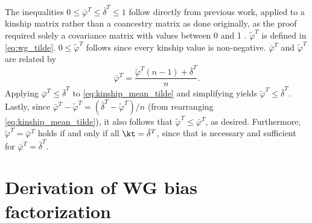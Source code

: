\documentclass[11pt]{article}
\begin{document}
\begin{appendices}
  The inequalities $0 \le \bar{\varphi}^T \le \bar{\delta}^T \le 1$ follow directly from previous work, applied to a kinship matrix rather than a coancestry matrix as done originally, as the proof required solely a covariance matrix with values between 0 and 1 \citep{ochoa_estimating_2021}.
  $\tilde{\varphi}^T$ is defined in \cref{eq:wg_tilde}.
  $0 \le \tilde{\varphi}^T$ follows since every kinship value is non-negative.
  $\bar{\varphi}^T$ and $\tilde{\varphi}^T$ are related by
  \begin{equation}
    \label{eq:kinship_mean_tilde}
    \bar{\varphi}^T
    =
    \frac{ \tilde{\varphi}^T (n-1) + \bar{\delta}^T }{n}.
  \end{equation}
  Applying $\bar{\varphi}^T \le \bar{\delta}^T$ to \cref{eq:kinship_mean_tilde} and simplifying yields $\tilde{\varphi}^T \le \bar{\delta}^T$.
  Lastly, since $\bar{\varphi}^T - \tilde{\varphi}^T = \left( \bar{\delta}^T - \tilde{\varphi}^T \right) / n$ (from rearranging \cref{eq:kinship_mean_tilde}), it also follows that $\tilde{\varphi}^T \le \bar{\varphi}^T$, as desired.
  Furthermore, $\tilde{\varphi}^T = \bar{\varphi}^T$ holds if and only if all $\kt = \bar{\delta}^T$, since that is necessary and sufficient for $\bar{\varphi}^T = \bar{\delta}^T$.

  \section{Derivation of WG bias factorization}
  
  \label{sec:wg_biasfunc}


\end{appendices}
\end{document}
